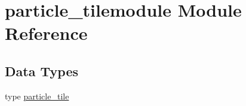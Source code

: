 \hypertarget{namespaceparticle__tilemodule}{}\section{particle\+\_\+tilemodule Module Reference}
\label{namespaceparticle__tilemodule}
\subsection*{Data Types}
\begin{DoxyCompactItemize}
\item 
type \hyperlink{structparticle__tilemodule_1_1particle__tile}{particle\+\_\+tile}
\end{DoxyCompactItemize}
